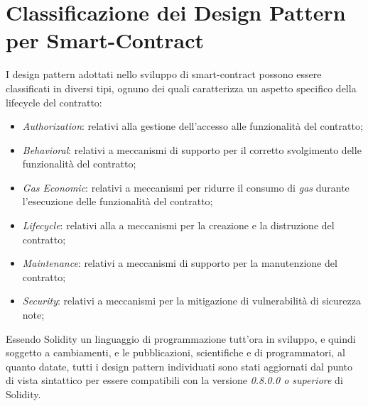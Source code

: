 \chapter{Classificazione dei Design Pattern per Smart-Contract}
I design pattern adottati nello sviluppo di smart-contract possono essere classificati in diversi tipi\cite[alcuni tipi]{9089272}\cite{9050163}, ognuno dei quali caratterizza un aspetto specifico della lifecycle del contratto:

\begin{itemize}
	\item \textit{Authorization}: relativi alla gestione dell'accesso alle funzionalità del contratto;
	\item \textit{Behavioral}: relativi a meccanismi di supporto per il corretto svolgimento delle funzionalità del contratto;
	\item \textit{Gas Economic}: relativi a meccanismi per ridurre il consumo di \textit{gas} durante l'esecuzione delle funzionalità del contratto;
	\item \textit{Lifecycle}: relativi alla a meccanismi per la creazione e la distruzione del contratto;
	\item \textit{Maintenance}: relativi a meccanismi di supporto per la manutenzione del contratto;
	\item \textit{Security}: relativi a meccanismi per la mitigazione di vulnerabilità di sicurezza note;
\end{itemize}
Essendo Solidity un linguaggio di programmazione tutt'ora in sviluppo, e quindi soggetto a cambiamenti, e le pubblicazioni, scientifiche e di programmatori, al quanto datate, tutti i design pattern individuati sono stati aggiornati dal punto di vista sintattico per essere compatibili con la versione \textit{0.8.0.0 o superiore} di Solidity. 

